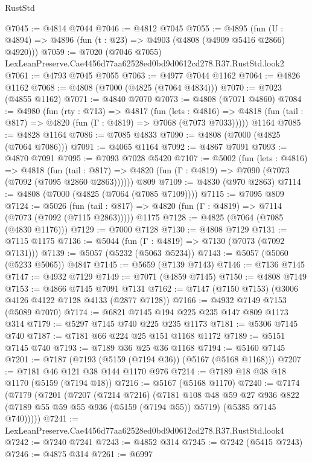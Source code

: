 \begin{lexlean}{RustStd}
\begin{coremodule}
@7045 := @4814 @7044
@7046 := @4812 @7045
@7055 := @4895 (fun (U : @4894) => @4896 (fun (t : @23) => @4903 (@4808 (@4909 @5416 @2866) @4920)))
@7059 := @7020 (@7046 @7055) LexLeanPreserve.Cae4456d77aa62528ed0bd9d0612cd278.R37.RustStd.look2
@7061 := @4793 @7045 @7055
@7063 := @4977 @7044 @1162
@7064 := @4826 @1162
@7068 := @4808 (@7000 (@4825 (@7064 @4834)))
@7070 := @7023 (@4855 @1162)
@7071 := @4840 @7070
@7073 := @4808 (@7071 @4860)
@7084 := @4980
    (fun (rty : @713) =>
    @4817
      (fun (lets : @4816) =>
      @4818 (fun (tail : @817) => @4820 (fun (Γ : @4819) => @7068 (@7073 @7033)))))
    @1164
@7085 := @4828 @1164
@7086 := @7085 @4833
@7090 := @4808 (@7000 (@4825 (@7064 @7086)))
@7091 := @4065 @1164
@7092 := @4867 @7091
@7093 := @4870 @7091
@7095 := @7093 @7028 @5420
@7107 := @5002
    (fun (lets : @4816) =>
    @4818
      (fun (tail : @817) => @4820 (fun (Γ : @4819) => @7090 (@7073 (@7092 (@7095 @2860 @2863))))))
    @809
@7109 := @4830 (@970 @2863)
@7114 := @4808 (@7000 (@4825 (@7064 (@7085 @7109))))
@7115 := @7095 @809
@7124 := @5026
    (fun (tail : @817) => @4820 (fun (Γ : @4819) => @7114 (@7073 (@7092 (@7115 @2863)))))
    @1175
@7128 := @4825 (@7064 (@7085 (@4830 @1176)))
@7129 := @7000 @7128
@7130 := @4808 @7129
@7131 := @7115 @1175
@7136 := @5044 (fun (Γ : @4819) => @7130 (@7073 (@7092 @7131)))
@7139 := @5057 (@5232 (@5063 @5234))
@7143 := @5057 (@5060 (@5233 @5065)) @4847
@7145 := @5659 (@7139 @7143)
@7146 := @7136 @7145
@7147 := @4932 @7129
@7149 := @7071 (@4859 @7145)
@7150 := @4808 @7149
@7153 := @4866 @7145 @7091 @7131
@7162 := @7147 (@7150 @7153) (@3006 @4126 @4122 @7128 @4133 (@2877 @7128))
@7166 := @4932 @7149 @7153 (@5089 @7070)
@7174 := @6821 @7145 @194 @225 @235 @147 @809 @1173 @314
@7179 := @5297 @7145 @740 @225 @235 @1173
@7181 := @5306 @7145 @740
@7187 := @7181 @66 @224 @25 @151 @1168 @1172
@7189 := @5151 @7145 @740
@7193 := @7189 @36 @25 @36 @1168
@7194 := @5160 @7145
@7201 := @7187 (@7193 (@5159 (@7194 @36)) (@5167 (@5168 @1168)))
@7207 := @7181 @46 @121 @38 @144 @1170 @976
@7214 := @7189 @18 @38 @18 @1170 (@5159 (@7194 @18))
@7216 := @5167 (@5168 @1170)
@7240 := @7174
    (@7179
      (@7201
        (@7207
          (@7214 @7216)
          (@7181
            @108
            @48
            @59
            @27
            @936
            @822
            (@7189 @55 @59 @55 @936 (@5159 (@7194 @55)) @5719)
            (@5385 @7145 @740)))))
@7241 := LexLeanPreserve.Cae4456d77aa62528ed0bd9d0612cd278.R37.RustStd.look4
@7242 := @7240 @7241
@7243 := @4852 @314
@7245 := @7242 (@5415 @7243)
@7246 := @4875 @314
@7261 := @6997

\end{coremodule}
\end{lexlean}
